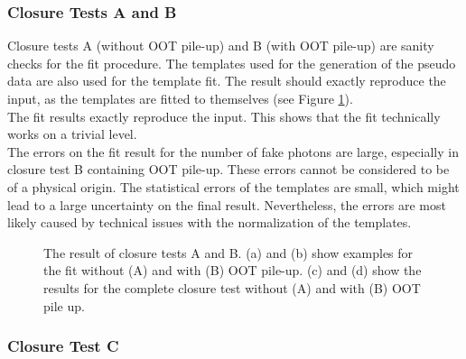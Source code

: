 \subsubsection{Closure Tests A and B}

Closure tests A (without OOT pile-up) and B (with OOT pile-up) are sanity checks for the fit procedure. The templates used for the generation of the pseudo data are also used for the template fit. The result should exactly reproduce the input, as the templates are fitted to themselves (see Figure \ref{fig_ttg_clo_toy}).\\
The fit results exactly reproduce the input. This shows that the fit technically works on a trivial level. \\
The errors on the fit result for the number of fake photons are large, especially in closure test B containing OOT pile-up. These errors cannot be considered to be of a physical origin. The statistical errors of the templates are small, which might lead to a large uncertainty on the final result. Nevertheless, the errors are most likely caused by technical issues with the normalization of the templates. \enlargethispage{\baselineskip}\\

\begin{figure}[ht]
  \caption{The result of closure tests A and B. (a) and (b) show examples for the fit without (A) and with (B) OOT pile-up. (c) and (d) show the results for the complete closure test without (A) and with (B) OOT pile up.}
  \label{fig_ttg_clo_toy}
\end{figure}


\FloatBarrier
\subsubsection{Closure Test C}
\label{sec_ttg_clo_norm}

